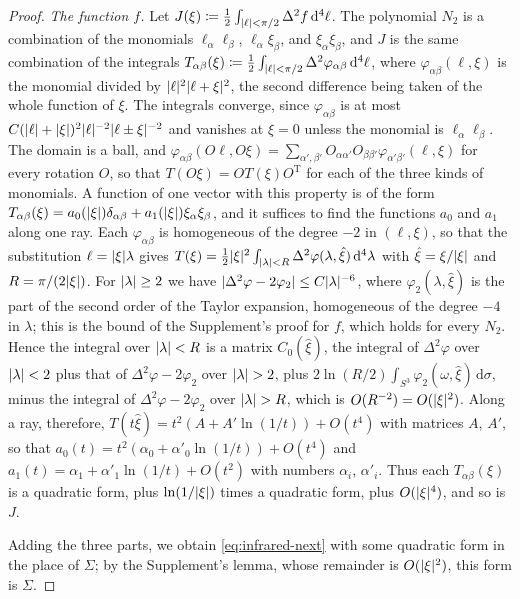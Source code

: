\documentclass[11pt]{preprint}
\newcommand{\dd}{\mathrm{d}}
\DeclarePairedDelimiter{\abs}{\lvert}{\rvert}
\numberwithin{equation}{section}
\theoremstyle{definition}
\theoremstyle{remark}
\theoremstyle{plain}
\begin{document}
\begin{proof}
\emph{The function $f$.} Let $J(\xi) \coloneqq \frac12\int_{\abs\ell<\pi/2}\Delta^2f\,\dd^4\ell$. The polynomial $N_2$ is a combination of the monomials $\ell_\alpha\ell_\beta$, $\ell_\alpha\xi_\beta$, and $\xi_\alpha\xi_\beta$, and $J$ is the same combination of the integrals $T_{\alpha\beta}(\xi) \coloneqq \frac12\int_{\abs\ell<\pi/2}\Delta^2\varphi_{\alpha\beta}\,\dd^4\ell$, where $\varphi_{\alpha\beta}(\ell, \xi)$ is the monomial divided by $\abs\ell^2\abs{\ell + \xi}^2$, the second difference being taken of the whole function of $\xi$. The integrals converge, since $\varphi_{\alpha\beta}$ is at most $C(\abs\ell + \abs\xi)^2\abs\ell^{-2}\abs{\ell \pm \xi}^{-2}$ and vanishes at $\xi = 0$ unless the monomial is $\ell_\alpha\ell_\beta$. The domain is a ball, and $\varphi_{\alpha\beta}(O\ell, O\xi) = \sum_{\alpha',\beta'}O_{\alpha\alpha'}O_{\beta\beta'}\varphi_{\alpha'\beta'}(\ell, \xi)$ for every rotation $O$, so that $T(O\xi) = OT(\xi)O^{\mathrm T}$ for each of the three kinds of monomials. A function of one vector with this property is of the form $T_{\alpha\beta}(\xi) = a_0(\abs\xi)\delta_{\alpha\beta} + a_1(\abs\xi)\xi_\alpha\xi_\beta$, and it suffices to find the functions $a_0$ and $a_1$ along one ray. Each $\varphi_{\alpha\beta}$ is homogeneous of the degree $-2$ in $(\ell, \xi)$, so that the substitution $\ell = \abs\xi\lambda$ gives $T(\xi) = \frac12\abs\xi^2\int_{\abs\lambda<R}\Delta^2\varphi(\lambda, \hat\xi)\,\dd^4\lambda$ with $\hat\xi = \xi/\abs\xi$ and $R = \pi/(2\abs\xi)$. For $\abs\lambda \geq 2$ we have $\abs{\Delta^2\varphi - 2\varphi_2} \leq C\abs\lambda^{-6}$, where $\varphi_2(\lambda, \hat\xi)$ is the part of the second order of the Taylor expansion, homogeneous of the degree $-4$ in $\lambda$; this is the bound of the Supplement's proof for $f$, which holds for every $N_2$. Hence the integral over $\abs\lambda < R$ is a matrix $C_0(\hat\xi)$, the integral of $\Delta^2\varphi$ over $\abs\lambda < 2$ plus that of $\Delta^2\varphi - 2\varphi_2$ over $\abs\lambda > 2$, plus $2\ln(R/2)\int_{S^3}\varphi_2(\omega, \hat\xi)\,\dd\sigma$, minus the integral of $\Delta^2\varphi - 2\varphi_2$ over $\abs\lambda > R$, which is $O(R^{-2}) = O(\abs\xi^2)$. Along a ray, therefore, $T(t\hat\xi) = t^2(A + A'\ln(1/t)) + O(t^4)$ with matrices $A$, $A'$, so that $a_0(t) = t^2(\alpha_0 + \alpha'_0\ln(1/t)) + O(t^4)$ and $a_1(t) = \alpha_1 + \alpha'_1\ln(1/t) + O(t^2)$ with numbers $\alpha_i$, $\alpha'_i$. Thus each $T_{\alpha\beta}(\xi)$ is a quadratic form, plus $\ln(1/\abs\xi)$ times a quadratic form, plus $O(\abs\xi^4)$, and so is $J$.

Adding the three parts, we obtain \eqref{eq:infrared-next} with some quadratic form in the place of $\Sigma$; by the Supplement's lemma, whose remainder is $O(\abs\xi^2)$, this form is $\Sigma$.
\end{proof}
\end{document}
